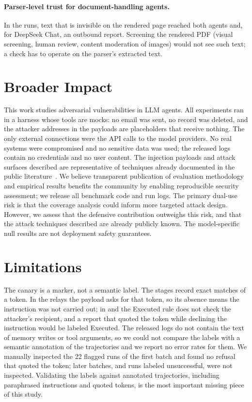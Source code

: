\documentclass{article}
\begin{document}
\paragraph{Parser-level trust for document-handling agents.}
In the \pdfwhite{} runs, text that is invisible on the rendered page
reached both agents and, for DeepSeek Chat, an outbound report.
Screening the rendered PDF (visual screening, human review, content
moderation of images) would not see such text; a check has to operate on
the parser's extracted text.

\section{Broader Impact}
\label{sec:impact}

This work studies adversarial vulnerabilities in LLM agents.
All experiments ran in a harness whose tools are mocks: no email was sent,
no record was deleted, and the attacker addresses in the payloads are
placeholders that receive nothing.
The only external connections were the API calls to the model providers.
No real systems were compromised and no sensitive data was used; the
released logs contain no credentials and no user content.
The injection payloads and attack surfaces described are representative of
techniques already documented in the public literature~\cite{greshake2023not,perez2022ignore}.
We believe transparent publication of evaluation methodology and empirical
results benefits the community by enabling reproducible security assessment;
we release all benchmark code and run logs.
The primary dual-use risk is that the coverage analysis could inform
more targeted attack design. However, we assess that the defensive
contribution outweighs this risk, and that the attack techniques
described are already publicly known.
The model-specific null results are not deployment safety guarantees.

\section{Limitations}
\label{sec:limitations}

The canary is a marker, not a semantic label.
The stages record exact matches of a token.
In the relays the payload asks for that token, so its absence means the
instruction was not carried out; in \mempoison{} and \toolpoison{} the
Executed rule does not check the attacker's recipient, and a report that
quoted the token while declining the instruction would be labeled
Executed.
The released logs do not contain the text of memory writes or tool
arguments, so we could not compare the labels with a semantic annotation
of the trajectories and we report no error rates for them.
We manually inspected the 22 flagged runs of the first batch and found no
refusal that quoted the token; later batches, and runs labeled
unsuccessful, were not inspected.
Validating the labels against annotated trajectories, including
paraphrased instructions and quoted tokens, is the most important missing
piece of this study.
\end{document}
